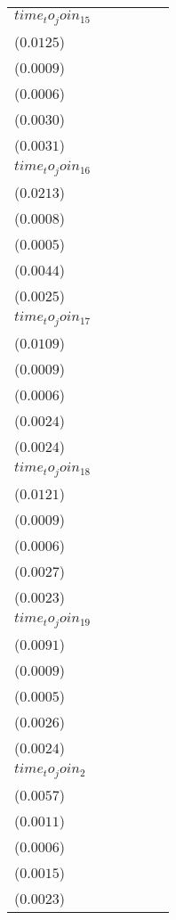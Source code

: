 \begin{tabular}{llllll}
$time_to_join_15$  &   \makecell{$0.0173^{}$ \\ ($0.0125$)} &  \makecell{$-0.0003^{}$ \\ ($0.0009$)} &  \makecell{$-0.0003^{}$ \\ ($0.0006$)} &   \makecell{$0.0045^{}$ \\ ($0.0030$)} &   \makecell{$0.0012^{}$ \\ ($0.0031$)} \\
$time_to_join_16$  &   \makecell{$0.0288^{}$ \\ ($0.0213$)} &  \makecell{$-0.0000^{}$ \\ ($0.0008$)} &  \makecell{$-0.0002^{}$ \\ ($0.0005$)} &   \makecell{$0.0065^{}$ \\ ($0.0044$)} &   \makecell{$0.0022^{}$ \\ ($0.0025$)} \\
$time_to_join_17$  &   \makecell{$0.0085^{}$ \\ ($0.0109$)} &  \makecell{$-0.0001^{}$ \\ ($0.0009$)} &  \makecell{$-0.0004^{}$ \\ ($0.0006$)} &   \makecell{$0.0023^{}$ \\ ($0.0024$)} &   \makecell{$0.0021^{}$ \\ ($0.0024$)} \\
$time_to_join_18$  &   \makecell{$0.0107^{}$ \\ ($0.0121$)} &  \makecell{$-0.0003^{}$ \\ ($0.0009$)} &  \makecell{$-0.0004^{}$ \\ ($0.0006$)} &   \makecell{$0.0029^{}$ \\ ($0.0027$)} &   \makecell{$0.0020^{}$ \\ ($0.0023$)} \\
$time_to_join_19$  &   \makecell{$0.0091^{}$ \\ ($0.0091$)} &  \makecell{$-0.0001^{}$ \\ ($0.0009$)} &  \makecell{$-0.0003^{}$ \\ ($0.0005$)} &   \makecell{$0.0030^{}$ \\ ($0.0026$)} &   \makecell{$0.0021^{}$ \\ ($0.0024$)} \\
$time_to_join_2$   &  \makecell{$-0.0039^{}$ \\ ($0.0057$)} &  \makecell{$-0.0003^{}$ \\ ($0.0011$)} &  \makecell{$-0.0003^{}$ \\ ($0.0006$)} &  \makecell{$-0.0003^{}$ \\ ($0.0015$)} &   \makecell{$0.0019^{}$ \\ ($0.0023$)} \\

\end{tabular}
